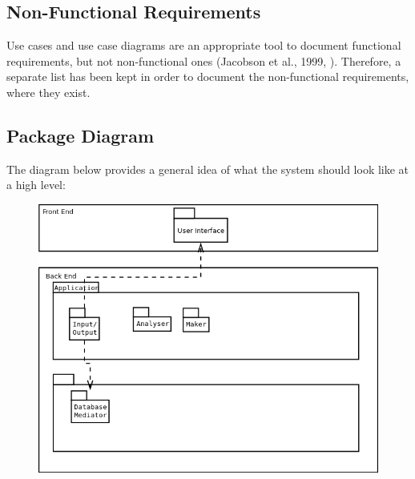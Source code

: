 \subsection{Non-Functional Requirements} \label{sec:Requirements.NonFunctionalRequirements}
Use cases and use case diagrams are an appropriate tool to document functional
requirements, but not non-functional ones (Jacobson et al., 1999,
\cite[cited][p.~153]{bennett2010object}). Therefore, a separate list has been
kept in order to document the non-functional requirements, where they exist.

\subsection{Package Diagram} \label{sec:Requirements.PackageDiagram}
The diagram below provides a general idea of what the system should look like at a high level:
\begin{figure}[ht!]
  \begin{center}
    \includegraphics[width=14cm]{./contents/img/Package_Diagram.png}
  \end{center}
\end{figure}
\FloatBarrier
